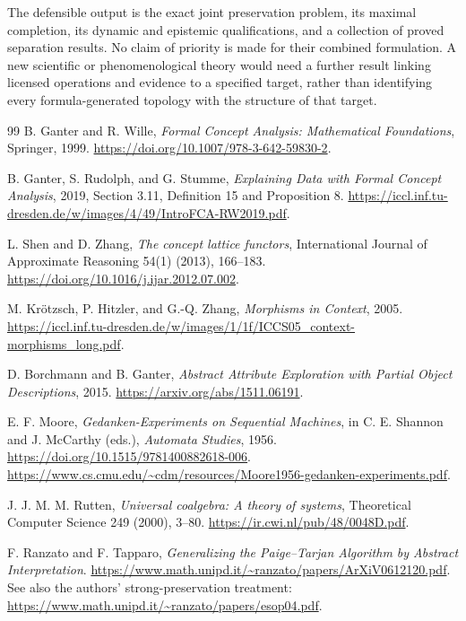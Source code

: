 \documentclass[11pt]{article}
\theoremstyle{definition}
\begin{document}
The defensible output is the exact joint preservation problem, its maximal
completion, its dynamic and epistemic qualifications, and a collection of
proved separation results. No claim of priority is made for their combined
formulation. A new scientific or phenomenological theory would need a further
result linking licensed operations and evidence to a specified target, rather
than identifying every formula-generated topology with the structure of that
target.

\begin{thebibliography}{99}
B. Ganter and R. Wille, \emph{Formal Concept Analysis: Mathematical
Foundations}, Springer, 1999.
\url{https://doi.org/10.1007/978-3-642-59830-2}.

B. Ganter, S. Rudolph, and G. Stumme,
\emph{Explaining Data with Formal Concept Analysis}, 2019,
Section 3.11, Definition 15 and Proposition 8.
\url{https://iccl.inf.tu-dresden.de/w/images/4/49/IntroFCA-RW2019.pdf}.

L. Shen and D. Zhang, \emph{The concept lattice functors},
International Journal of Approximate Reasoning 54(1) (2013), 166--183.
\url{https://doi.org/10.1016/j.ijar.2012.07.002}.

M. Kr\"otzsch, P. Hitzler, and G.-Q. Zhang,
\emph{Morphisms in Context}, 2005.
\url{https://iccl.inf.tu-dresden.de/w/images/1/1f/ICCS05_context-morphisms_long.pdf}.

D. Borchmann and B. Ganter,
\emph{Abstract Attribute Exploration with Partial Object Descriptions}, 2015.
\url{https://arxiv.org/abs/1511.06191}.

E. F. Moore, \emph{Gedanken-Experiments on Sequential Machines},
in C. E. Shannon and J. McCarthy (eds.), \emph{Automata Studies}, 1956.
\url{https://doi.org/10.1515/9781400882618-006}.
\url{https://www.cs.cmu.edu/~cdm/resources/Moore1956-gedanken-experiments.pdf}.

J. J. M. M. Rutten, \emph{Universal coalgebra: A theory of systems},
Theoretical Computer Science 249 (2000), 3--80.
\url{https://ir.cwi.nl/pub/48/0048D.pdf}.

F. Ranzato and F. Tapparo,
\emph{Generalizing the Paige--Tarjan Algorithm by Abstract Interpretation}.
\url{https://www.math.unipd.it/~ranzato/papers/ArXiV0612120.pdf}.
See also the authors' strong-preservation treatment:
\url{https://www.math.unipd.it/~ranzato/papers/esop04.pdf}.


\end{thebibliography}
\end{document}
